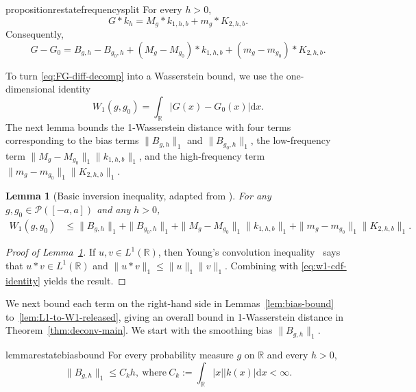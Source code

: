 \documentclass[english, 11pt]{article}
\newcommand{\mrd}{\mathrm{d}}
\theoremstyle{plain}
\newtheorem{lemma}[theorem]{Lemma}
\theoremstyle{definition}
\theoremstyle{remark}
\begin{document}
\begin{restatable}{proposition}{restatefrequencysplit}\label{prop:freq-split}
For every $h>0$,
\begin{equation}\label{eq:FGKh-decomp}
G*k_h = M_g*k_{1,h,b} + m_g*K_{2,h,b}.
\end{equation}
Consequently, 
\begin{equation}\label{eq:FG-diff-decomp}
G-G_0=B_{g,h}-B_{g_0,h}+(M_g-M_{g_0})*k_{1,h,b}+(m_g-m_{g_0})*K_{2,h,b}.
\end{equation}
\end{restatable}
To turn \eqref{eq:FG-diff-decomp} into a Wasserstein bound, we use the one-dimensional identity
\begin{equation}\label{eq:w1-cdf-identity}
W_1(g,g_0)=\int_{\mathbb R}|G(x)-G_0(x)| \mathrm d x.
\end{equation}
The next lemma bounds the 1-Wasserstein distance with four terms corresponding to the bias terms $\|B_{g,h}\|_1$ and $\|B_{g_0,h}\|_1$, the low-frequency term $\|M_g-M_{g_0}\|_1 \|k_{1,h,b}\|_1$, and the high-frequency term $\|m_g-m_{g_0}\|_1 \|K_{2,h,b}\|_1$.

\begin{lemma}[Basic inversion inequality, adapted from \cite{rousseau2024wasserstein}]\label{lem:basic-inversion}
For any $g,g_0\in\mathcal P([-a, a])$ and any $h>0$, 
\begin{align*}
W_1(g,g_0) &\le \|B_{g,h}\|_1+\|B_{g_0,h}\|_1 + \|M_g-M_{g_0}\|_1 \|k_{1,h,b}\|_1 + \|m_g-m_{g_0}\|_1 \|K_{2,h,b}\|_1.
\end{align*}
\end{lemma}
\begin{proof}[Proof of Lemma~\ref{lem:basic-inversion}]
If $u,v\in L^1(\mathbb R)$, then Young's convolution inequality~\citep[Theorem 3.9.4]{bogachev2007measure} says that $u*v\in L^1(\mathbb R)$ and $\|u*v\|_1 \le \|u\|_1 \|v\|_1$.
Combining with \eqref{eq:w1-cdf-identity} yields the result.
\end{proof}
We next bound each term on the right-hand side in Lemmas~\ref{lem:bias-bound} to~\ref{lem:L1-to-W1-released}, giving an overall bound in 1-Wasserstein distance in Theorem~\ref{thm:deconv-main}. 
We start with the smoothing bias $\|B_{g,h}\|_1$.

\begin{restatable}{lemma}{restatebiasbound}\label{lem:bias-bound}
For every probability measure $g$ on $\mathbb R$ and every $h>0$,
\begin{equation}\label{eq:bias-bound}
\|B_{g,h}\|_1 \le C_k h,\ \text{where}\ C_k:=\int_{\mathbb R}|x| |k(x)| \mrd x<\infty.
\end{equation}
\end{restatable}
\end{document}
